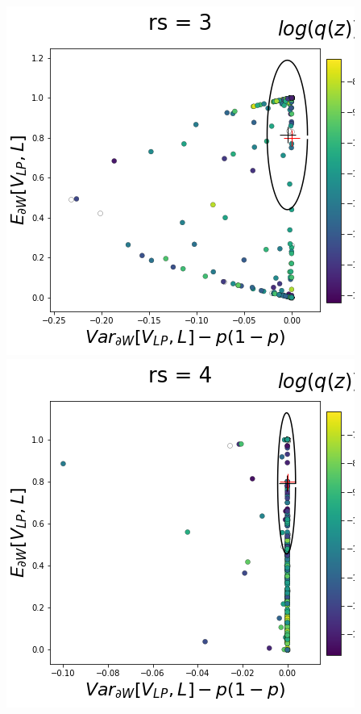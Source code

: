 \documentclass[11pt]{article}
\begin{document}
\begin{center}
\includegraphics[scale=0.33]{figs/T_x_SC_full_c=0_p=80_rs=3.png} \\
\includegraphics[scale=0.33]{figs/T_x_SC_full_c=0_p=80_rs=4.png}

\end{center}
\end{document}
